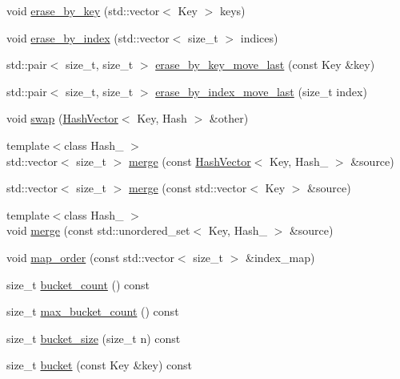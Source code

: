 \begin{DoxyCompactItemize}
\item 
void \mbox{\hyperlink{class_hash_vector_ac4f12a12ccc7fcfa0535bf411bfe2fb9}{erase\+\_\+by\+\_\+key}} (std\+::vector$<$ Key $>$ keys)
\item 
void \mbox{\hyperlink{class_hash_vector_aa941ff27b9180bdfb6e5a32defe81f0a}{erase\+\_\+by\+\_\+index}} (std\+::vector$<$ size\+\_\+t $>$ indices)
\item 
std\+::pair$<$ size\+\_\+t, size\+\_\+t $>$ \mbox{\hyperlink{class_hash_vector_a35f193e747a3005afce49dc6376cfafe}{erase\+\_\+by\+\_\+key\+\_\+move\+\_\+last}} (const Key \&key)
\item 
std\+::pair$<$ size\+\_\+t, size\+\_\+t $>$ \mbox{\hyperlink{class_hash_vector_a9c95c963022cb33ba0dff610ac56e655}{erase\+\_\+by\+\_\+index\+\_\+move\+\_\+last}} (size\+\_\+t index)
\item 
void \mbox{\hyperlink{class_hash_vector_a1b1083a530fe2420b309e921a9467b33}{swap}} (\mbox{\hyperlink{class_hash_vector}{Hash\+Vector}}$<$ Key, Hash $>$ \&other)
\item 
{\footnotesize template$<$class Hash\+\_ $>$ }\\std\+::vector$<$ size\+\_\+t $>$ \mbox{\hyperlink{class_hash_vector_ab01fbdc2f06fa662ba32745325687b34}{merge}} (const \mbox{\hyperlink{class_hash_vector}{Hash\+Vector}}$<$ Key, Hash\+\_ $>$ \&source)
\item 
std\+::vector$<$ size\+\_\+t $>$ \mbox{\hyperlink{class_hash_vector_a25a8f930a3a8bb4b63eb079148443ac4}{merge}} (const std\+::vector$<$ Key $>$ \&source)
\item 
{\footnotesize template$<$class Hash\+\_ $>$ }\\void \mbox{\hyperlink{class_hash_vector_a49f4a94f737008dfc3298e55c419b83f}{merge}} (const std\+::unordered\+\_\+set$<$ Key, Hash\+\_ $>$ \&source)
\item 
void \mbox{\hyperlink{class_hash_vector_a0ad83187e532c5ae897ba8d4edcdd2bc}{map\+\_\+order}} (const std\+::vector$<$ size\+\_\+t $>$ \&index\+\_\+map)
\item 
size\+\_\+t \mbox{\hyperlink{class_hash_vector_acff408f0ec8a936eeeccdc12d93e10d9}{bucket\+\_\+count}} () const
\item 
size\+\_\+t \mbox{\hyperlink{class_hash_vector_a6f77df9d2a526c3c025870e9c507a685}{max\+\_\+bucket\+\_\+count}} () const
\item 
size\+\_\+t \mbox{\hyperlink{class_hash_vector_a55b776a683a7bc4b8f56e2132ac9ee92}{bucket\+\_\+size}} (size\+\_\+t n) const
\item 
size\+\_\+t \mbox{\hyperlink{class_hash_vector_af296ee20435340b6cd0876e154779ecf}{bucket}} (const Key \&key) const

\end{DoxyCompactItemize}
